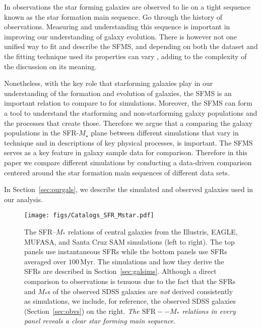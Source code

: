 \documentclass[preprint2,tighten]{aastex62}
\begin{document}
In observations the star forming galaxies are observed to lie on a tight sequence
known as the star formation main sequence. Go through the history of observations.
Measuring and understanding this sequence is important in improving our
understanding of galaxy evolution. There is however not one unified way to fit and describe the SFMS, and depending on both the dataset and the fitting technique used its properties can vary \citep[see e.g.][]{speagle2014}, adding to the complexity of the discussion on its meaning.

Nonetheless, with the key role that starforming galaxies play in our understanding of the formation and evolution of galaxies, the SFMS is an important relation to compare to for simulations. Moreover, the SFMS can form a tool to understand the starforming and non-starforming galaxy populations and the processes that create those. Therefore we argue that a comparing the galaxy populations in the SFR-$M_{\star}$ plane between different simulations that vary in technique and in descriptions of key physical processes, is important. The SFMS serves as a key feature in galaxy sample data for comparison. Therefore in this paper we compare different simulations by conducting a data-driven comparison centered around the star formation main 
sequences of different data sets. 

In Section~\ref{sec:ourgals}, we describe the simulated and observed galaxies 
used in our analysis. 


\begin{figure*}
\begin{center}
\texttt{[image: figs/Catalogs\_SFR\_Mstar.pdf]} 
\caption{The SFR--$M_*$ relations of central galaxies from the Illustris, 
EAGLE, MUFASA, and Santa Cruz SAM simulations (left to right). The 
top panels use instantaneous SFRs while the bottom panels use SFRs 
averaged over $100\,\mathrm{Myr}$. The simulations and how they derive 
the SFRs are described in Section~\ref{sec:galsims}. Although a
direct comparison to observations is tenuous due to the fact that 
the SFRs and $M_*$s of the observed SDSS galaxies are \emph{not} 
derived consistently as simulations, we include, for reference, the 
observed  SDSS galaxies (Section~\ref{sec:obvs}) on the right. 
\emph{The $\mathrm{SFR}--M_*$ relations in every panel reveals a 
clear star forming main sequence.}} 
\label{fig:sfrmstar}
\end{center}
\end{figure*}
\end{document}
